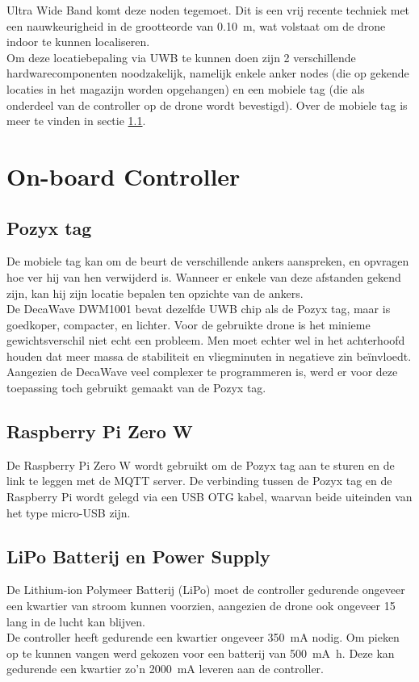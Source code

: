 Ultra Wide Band komt deze noden tegemoet. Dit is een vrij recente techniek met een nauwkeurigheid in de grootteorde van \SI{0.10}{\m}, wat volstaat om de drone indoor te kunnen localiseren.\\

Om deze locatiebepaling via UWB te kunnen doen zijn 2 verschillende hardwarecomponenten noodzakelijk, namelijk enkele anker nodes (die op gekende locaties in het magazijn worden opgehangen) en een mobiele tag (die als onderdeel van de controller op de drone wordt bevestigd). Over de mobiele tag is meer te vinden in sectie \ref{sec:pozyx_tag}.

\section{On-board Controller} \label{sec:onboard_controller}
\subsection{Pozyx tag}  \label{sec:pozyx_tag}
De mobiele tag kan om de beurt de verschillende ankers aanspreken, en opvragen hoe ver hij van hen verwijderd is. Wanneer er enkele van deze afstanden gekend zijn, kan hij zijn locatie bepalen ten opzichte van de ankers.\\

De DecaWave DWM1001 bevat dezelfde UWB chip als de Pozyx tag, maar is goedkoper, compacter, en lichter.
Voor de gebruikte drone is het minieme gewichtsverschil niet echt een probleem.
Men moet echter wel in het achterhoofd houden dat meer massa de stabiliteit en vliegminuten in negatieve zin be\"invloedt.\\
Aangezien de DecaWave veel complexer te programmeren is, werd er voor deze toepassing toch gebruikt gemaakt van de Pozyx tag.

\subsection{Raspberry Pi Zero W} \label{sec:raspberry_pi}
De Raspberry Pi Zero W wordt gebruikt om de Pozyx tag aan te sturen en de link te leggen met de MQTT server.
De verbinding tussen de Pozyx tag en de Raspberry Pi wordt gelegd via een USB OTG kabel, waarvan beide uiteinden van het type micro-USB zijn.

\subsection{LiPo Batterij en Power Supply} \label{sec:lipo}
De Lithium-ion Polymeer Batterij (LiPo) moet de controller gedurende ongeveer een kwartier van stroom kunnen voorzien, aangezien de drone ook ongeveer \SI{15}{\min} lang in de lucht kan blijven.\\
De controller heeft gedurende een kwartier ongeveer \SI{350}{\mA} nodig.
Om pieken op te kunnen vangen werd gekozen voor een batterij van \SI{500}{\mA\hour}.
Deze kan gedurende een kwartier zo'n \SI{2000}{\mA} leveren aan de controller.\\

